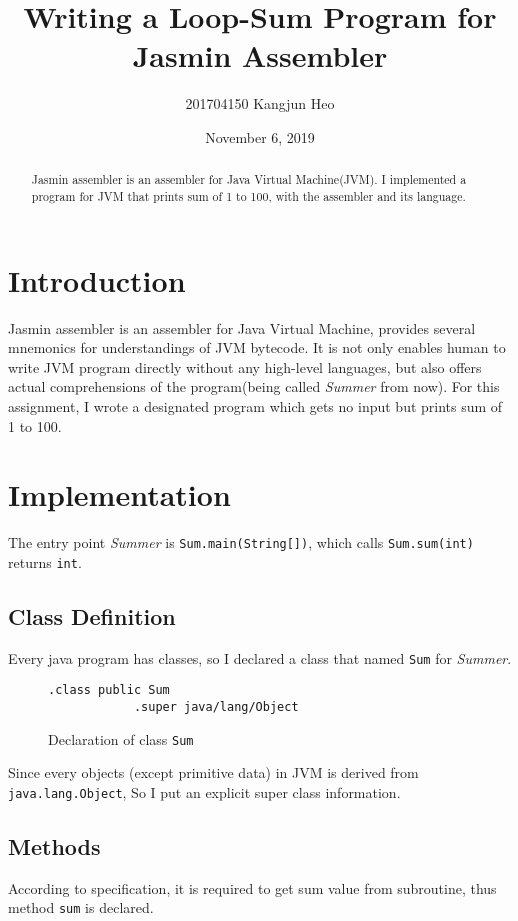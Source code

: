 \documentclass[a4paper, 12pt]{article}
\title{Writing a Loop-Sum Program for Jasmin Assembler}
\date{November 6, 2019}
\author{201704150 Kangjun Heo}
\begin{document}
    \maketitle

    \begin{abstract}
        Jasmin assembler is an assembler for Java Virtual Machine(JVM). I implemented a program for JVM that prints sum of 1 to 100, with the assembler and its language.
    \end{abstract}

    \section{Introduction}
    Jasmin assembler is an assembler for Java Virtual Machine, provides several mnemonics for understandings of JVM bytecode.\cite{oracle_isa} It is not only enables human to write JVM program directly without any high-level languages, but also offers actual comprehensions of the program(being called \textit{Summer} from now). For this assignment, I wrote a designated program which gets no input but prints sum of 1 to 100.

    \section{Implementation}
    The entry point \textit{Summer} is \texttt{Sum.main(String[])}, which calls \texttt{Sum.sum(int)} returns \texttt{int}.

        \subsection{Class Definition}
        Every java program has classes, so I declared a class that named \texttt{Sum} for \textit{Summer}.
        \begin{figure}[H]
            \begin{lstlisting}[gobble=8]
            .class public Sum
            .super java/lang/Object
            \end{lstlisting}
    
            \centering        
            \caption{Declaration of class \texttt{Sum}}
        \end{figure}
        Since every objects (except primitive data) in JVM is derived from \texttt{java.lang.Object}, So I put an explicit super class information.  

        \subsection{Methods}
        According to specification, it is required to get sum value from subroutine, thus method \texttt{sum} is declared.
\end{document}
